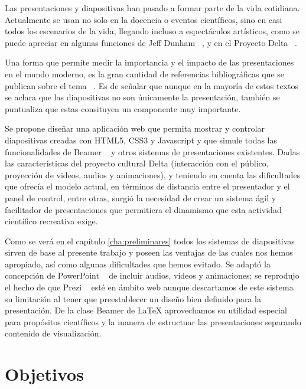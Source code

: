 \begin{introduction}

	Las presentaciones y diapositivas han pasado a formar parte de la vida cotidiana. Actualmente se usan no solo en la docencia o eventos científicos, sino en casi todos los escenarios de la vida, llegando incluso a espectáculos artísticos, como se puede apreciar en algunas funciones de Jeff Dunham ~\cite{dunham}, y en el Proyecto Delta ~\cite{delta}.


	Una forma que permite medir la importancia y el impacto de las presentaciones en el mundo moderno, es la gran cantidad de referencias bibliográficas que se publican sobre el tema ~\cite{alley, duarte, tufte}. Es de señalar que aunque en la mayoría de estos textos se aclara que las diapositivas no son únicamente la presentación, también se puntualiza que estas consituyen un componente muy importante.

	Se propone diseñar una aplicación web que permita mostrar y controlar diapositivas creadas con HTML5, CSS3 y Javascript y que simule todas las funcionalidades de Beamer ~\cite{beamer} y otros sistemas de presentaciones existentes. Dadas las características del proyecto cultural Delta (interacción con el público, proyección de videos, audios y animaciones), y teniendo en cuenta las dificultades que ofrecía el modelo actual, en términos de distancia entre el presentador y el panel de control, entre otras, surgió la necesidad de crear un sistema ágil y facilitador de presentaciones que permitiera el dinamismo que esta actividad científico recreativa exige.

	Como se verá en el capítulo \ref{cha:preliminares} todos los sistemas de diapositivas sirven de base al presente trabajo y poseen las ventajas de las cuales nos hemos apropiado, así como algunas dificultades que hemos evitado. Se adaptó la concepción de PowerPoint ~\cite{powerpoint} de incluir audios, videos y animaciones; se reprodujo el hecho de que Prezi ~\cite{prezi} esté en ámbito web aunque descartamos de este sistema su limitación al tener que preestablecer un diseño bien definido para la presentación. De la clase Beamer de \LaTeX{} aprovechamos su utilidad especial para propósitos científicos y la manera de estructuar las presentaciones separando contenido de visualización.

	\section{Objetivos} %
	\label{sec:objetivos}


\end{introduction}
